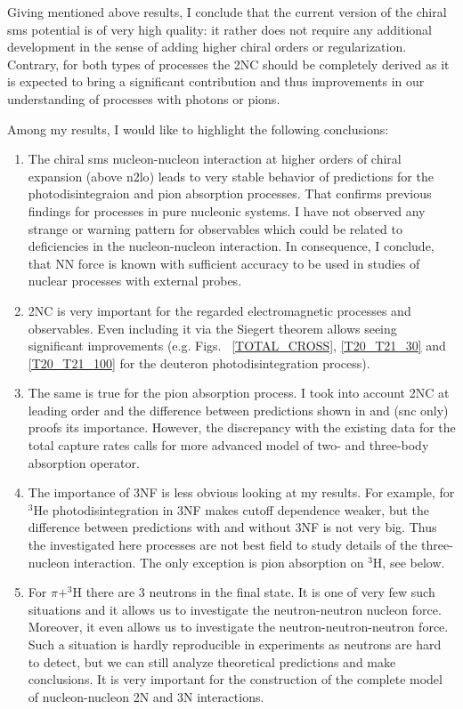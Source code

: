 Giving mentioned above results, I conclude that the current version of 
the chiral \gls{sms} potential is of very high quality:
it rather does not require any additional development in the sense of adding higher chiral orders or regularization.
Contrary, for both types of processes the 2NC should be completely derived as it is expected to bring 
a significant contribution and thus improvements in our understanding of processes
with photons or pions.

Among my results, I would like to highlight the following 
conclusions:

\begin{enumerate}
    \item The chiral \gls{sms} nucleon-nucleon interaction at higher orders of chiral expansion (above \gls{n2lo})
    leads to very stable behavior of predictions for the photodisintegraion and pion absorption processes.
    That confirms previous findings for processes in pure nucleonic systems.
    I have not observed any strange or warning pattern for observables which could be related to
    deficiencies in the nucleon-nucleon interaction.
    In consequence, I conclude, that NN force is known with sufficient accuracy to be used in studies of 
    nuclear processes with external probes.
    \item 2NC is very important for the regarded electromagnetic processes and observables. Even including it via the Siegert theorem allows seeing significant improvements (e.g. Figs.~ \ref{TOTAL_CROSS}, \ref{T20_T21_30} and \ref{T20_T21_100} for the deuteron photodisintegration process).
    \item The same is true for the pion absorption process. I took into account 2NC at leading order and the difference between
    predictions shown in  and  (\gls{snc} only) proofs its importance.
    However, the discrepancy with the existing data for the total capture rates calls for more advanced model of two-
    and three-body absorption operator.
    \item The importance of 3NF is less obvious looking at my results.
    For example, for $^3$He photodisintegration in  3NF makes cutoff dependence weaker,
    but the difference between predictions with and without 3NF is not very big.
    Thus the investigated here processes are not best field to study details
    of the three-nucleon interaction.
    The only exception is pion absorption on $^3$H, see below.
    \item For $\pi + ^3$H there are 3 neutrons in the final state. It is one of very few such situations and it allows us to investigate the neutron-neutron nucleon force. Moreover, it even allows us to investigate the neutron-neutron-neutron force. Such a situation is hardly reproducible in experiments as neutrons are hard to detect, but we can still analyze theoretical predictions and make conclusions. It is very important for the construction of the complete model of nucleon-nucleon 2N and 3N interactions.

\end{enumerate}
